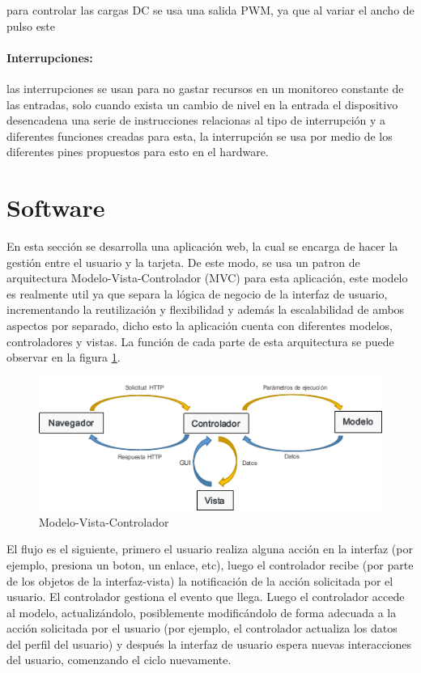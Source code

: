 para controlar las cargas DC se usa una salida PWM, ya que al variar el ancho de pulso este

\paragraph{Interrupciones:}

las interrupciones se usan para no gastar recursos en un monitoreo constante de las entradas, solo cuando exista un cambio de nivel en la entrada el dispositivo desencadena una serie de instrucciones relacionas al tipo de interrupción y a diferentes funciones creadas para esta, la interrupción se usa por medio de los diferentes pines propuestos para esto en el hardware.

\section{Software}

En esta sección se desarrolla una aplicación web, la cual se encarga de hacer la gestión entre el usuario y la tarjeta. De este modo, se usa un patron de arquitectura Modelo-Vista-Controlador (MVC) para esta aplicación, este modelo es realmente util ya que separa la lógica de negocio de la interfaz de usuario, incrementando la reutilización y flexibilidad y además la escalabilidad de ambos aspectos por separado, dicho esto la aplicación cuenta con diferentes modelos, controladores y vistas. La función de cada parte de esta arquitectura se puede observar en la figura \ref{fig:mvc}.\\


\begin{figure}
	\centering
	\caption{Modelo-Vista-Controlador}
	\label{fig:mvc}
	\includegraphics[width=0.7\linewidth]{Imagenes/MVC}
\end{figure}


El flujo es el siguiente, primero el usuario realiza alguna acción en la interfaz (por ejemplo, presiona un boton, un enlace, etc), luego el controlador recibe (por parte de los objetos de la interfaz-vista) la notificación de la acción solicitada por el usuario. El controlador gestiona el evento que llega. Luego el controlador accede al modelo, actualizándolo, posiblemente modificándolo de forma adecuada a la acción solicitada por el usuario (por ejemplo, el controlador actualiza los datos del perfil del usuario) y después la interfaz de usuario espera nuevas interacciones del usuario, comenzando el ciclo nuevamente.\\

